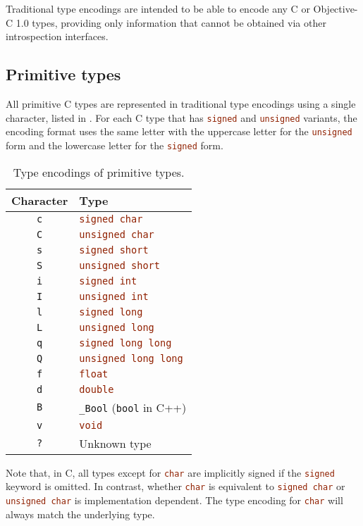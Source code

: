 \documentclass[a4paper]{report}
\newcommand{\ccode}[1]{\lstinline[language={C}]{#1}}
\begin{document}
Traditional type encodings are intended to be able to encode any C or Objective-C 1.0 types, providing only information that cannot be obtained via other introspection interfaces.

\subsection{Primitive types}

All primitive C types are represented in traditional type encodings using a single character, listed in .
For each C type that has \ccode{signed} and \ccode{unsigned} variants, the encoding format uses the same letter with the uppercase letter for the \ccode{unsigned} form and the lowercase letter for the \ccode{signed} form.

\begin{table}
	\begin{center}
		\begin{tabular}{c|l}
			Character & Type\\\hline
			\texttt{c} & \ccode{signed char} \\
			\texttt{C} & \ccode{unsigned char} \\
			\texttt{s} & \ccode{signed short} \\
			\texttt{S} & \ccode{unsigned short} \\
			\texttt{i} & \ccode{signed int} \\
			\texttt{I} & \ccode{unsigned int} \\
			\texttt{l} & \ccode{signed long} \\
			\texttt{L} & \ccode{unsigned long} \\
			\texttt{q} & \ccode{signed long long} \\
			\texttt{Q} & \ccode{unsigned long long} \\
			\texttt{f} & \ccode{float} \\
			\texttt{d} & \ccode{double} \\
			\texttt{B} & \ccode{_Bool} (\ccode{bool} in C++)\\
			\texttt{v} & \ccode{void}\\
			\texttt{?} & Unknown type
		\end{tabular}
		\caption{\label{tab:primencode}Type encodings of primitive types.}
	\end{center}
\end{table}

Note that, in C, all types except for \ccode{char} are implicitly signed if the \ccode{signed} keyword is omitted.
In contrast, whether \ccode{char} is equivalent to \ccode{signed char} or \ccode{unsigned char} is implementation dependent.
The type encoding for \ccode{char} will always match the underlying type.
\end{document}
